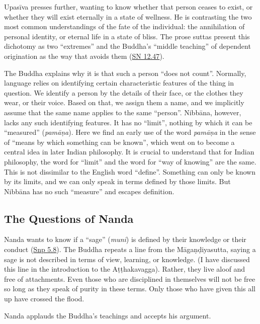 \documentclass[12pt,openany]{book}%
\begin{document}
\textsanskrit{Upasīva} presses further, wanting to know whether that person ceases to exist, or whether they will exist eternally in a state of wellness. He is contrasting the two most common understandings of the fate of the individual: the annihilation of personal identity, or eternal life in a state of bliss. The prose suttas present this dichotomy as two “extremes” and the Buddha’s “middle teaching” of dependent origination as the way that avoids them (\href{https://suttacentral.net/sn12.47/en/sujato}{SN 12.47}).

The Buddha explains why it is that such a person “does not count”. Normally, language relies on identifying certain characteristic features of the thing in question. We identify a person by the details of their face, or the clothes they wear, or their voice. Based on that, we assign them a name, and we implicitly assume that the same name applies to the same “person”. \textsanskrit{Nibbāna}, however, lacks any such identifying features. It has no “limit”, nothing by which it can be “measured” (\textit{\textsanskrit{pamāṇa}}). Here we find an early use of the word \textit{\textsanskrit{pamāṇa}} in the sense of “means by which something can be known”, which went on to become a central idea in later Indian philosophy. It is crucial to understand that for Indian philosophy, the word for “limit” and the word for “way of knowing” are the same. This is not dissimilar to the English word “define”. Something can only be known by its limits, and we can only speak in terms defined by those limits. But \textsanskrit{Nibbāna} has no such “measure” and escapes definition.

\subsection*{The Questions of Nanda}

Nanda wants to know if a “sage” (\textit{muni}) is defined by their knowledge or their conduct (\href{https://suttacentral.net/snp5.8/en/sujato}{Snp 5.8}). The Buddha repeats a line from the \textsanskrit{Māgaṇḍiyasutta}, saying a sage is not described in terms of view, learning, or knowledge. (I have discussed this line in the introduction to the \textsanskrit{Aṭṭhakavagga}). Rather, they live aloof and free of attachments. Even those who are disciplined in themselves will not be free so long as they speak of purity in these terms. Only those who have given this all up have crossed the flood.

Nanda applauds the Buddha’s teachings and accepts his argument.
\end{document}
